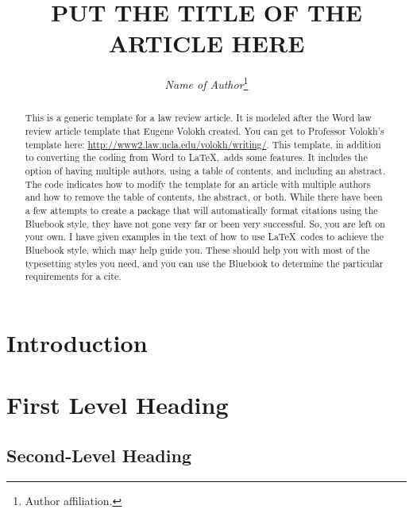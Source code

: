 \documentclass[letterpaper,12pt,twoside]{article}
\title{\Large{\uppercase{Put The Title Of The Article Here}}}
\author{\large\emph{Name of Author}\thanks{Author affiliation.}}
\date{} %
\begin{document}

\maketitle
\thispagestyle{empty}

	\begin{abstract}
	This is a generic template for a law review article. It is modeled after the Word law review article template that Eugene Volokh created. You can get to Professor Volokh's template here: \url{http://www2.law.ucla.edu/volokh/writing/}. This template, in addition to converting the coding from Word to \LaTeX,~adds some features. It includes the option of having multiple authors, using a table of contents, and including an abstract. The code indicates how to modify the template for an article with multiple authors and how to remove the table of contents, the abstract, or both. While there have been a few attempts to create a package that will automatically format citations using the Bluebook style, they have not gone very far or been very successful. So, you are left on your own. I have given examples in the text of how to use \LaTeX~codes to achieve the Bluebook style, which may help guide you. These should help you with most of the typesetting styles you need, and you can use the Bluebook to determine the particular requirements for a cite. 
	\end{abstract}

\tableofcontents %
\vspace{14pt}
\clearpage

\section*{Introduction}

\lipsum[1-2] %

\section{First Level Heading}

\lipsum[1]

	\begin{quote}
		\lipsum[2]
	\end{quote}

\subsection{Second-Level Heading}
\end{document}
